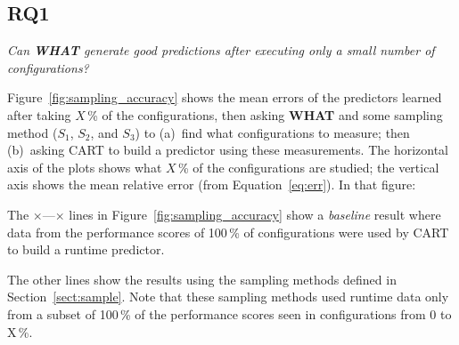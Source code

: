 \documentclass{newsig}
\newcommand{\fig}[1]{Figure~\ref{fig:#1}}
\newcommand{\eq}[1]{Equation~\ref{eq:#1}}
\newcommand{\what}{{\bf WHAT }}
\begin{document}
\subsection{RQ1}

\begin{center}
{\em Can  \what generate good predictions after
executing only a small number of configurations?}
\end{center}

\noindent \fig{sampling_accuracy} shows the mean errors of the predictors learned
after taking $X$\,\% of the configurations, then asking  \what and some sampling method ($S_1$, $S_2$, and $S_3$)
to (a)~find what configurations to measure; then (b)~asking CART to build a predictor
using these measurements. The horizontal axis of the plots shows what $X$\,\%
of the configurations are studied; the vertical axis shows the mean relative error (from \eq{err}).
In that figure:
\begin{compactitem}
\item
The $\times$\hspace{-2pt}---\hspace{-2pt}$\times$ lines in \fig{sampling_accuracy} show a {\em baseline} result
where data from the performance scores of 100\,\% of  configurations were used by CART
to build a runtime predictor.
\item
The other lines show the results using the sampling methods defined in Section~\ref{sect:sample}.
Note that these sampling methods used  runtime data only from a
subset of 100\,\% of the performance scores seen in configurations
from 0 to X\,\%.
\end{compactitem}

\end{document}
